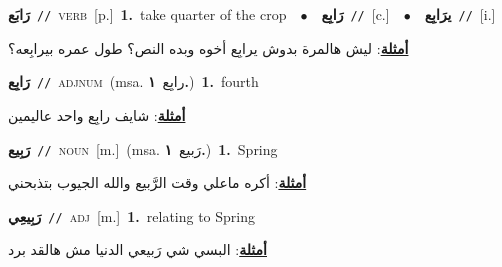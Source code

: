 \documentclass[10pt,a4paper,twoside]{article} %
\begin{document}
\begin{multicols}{2}
{\setlength\topsep{0pt}\textbf{\foreignlanguage{arabic}{رَابَع}}\ {\color{gray}\texttt{//}\color{black}}\ \textsc{verb}\ [p.]\ \textbf{1.}~take quarter of the crop\ \ $\bullet$\ \ \setlength\topsep{0pt}\textbf{\foreignlanguage{arabic}{رَابِع}}\ {\color{gray}\texttt{//}\color{black}}\ [c.]\ \ $\bullet$\ \ \setlength\topsep{0pt}\textbf{\foreignlanguage{arabic}{يرَابِع}}\ {\color{gray}\texttt{//}\color{black}}\ [i.]\  \begin{flushright}\color{gray}\foreignlanguage{arabic}{\textbf{\underline{\foreignlanguage{arabic}{أمثلة}}}: ليش هالمرة بدوش يرابِع أخوه وبده النص؟ طول عمره بيرابِعه؟}\end{flushright}\color{black}} \vspace{2mm}

{\setlength\topsep{0pt}\textbf{\foreignlanguage{arabic}{رَابِع}}\ {\color{gray}\texttt{//}\color{black}}\ \textsc{adj\textunderscore num}\ \color{gray}(msa. \foreignlanguage{arabic}{رابِع}~\foreignlanguage{arabic}{\textbf{١.}})\color{black}\ \textbf{1.}~fourth\  \begin{flushright}\color{gray}\foreignlanguage{arabic}{\textbf{\underline{\foreignlanguage{arabic}{أمثلة}}}: شايف رابِع واحد عاليمين}\end{flushright}\color{black}} \vspace{2mm}

{\setlength\topsep{0pt}\textbf{\foreignlanguage{arabic}{رَبِيع}}\ {\color{gray}\texttt{//}\color{black}}\ \textsc{noun}\ [m.]\ \color{gray}(msa. \foreignlanguage{arabic}{رَبيع}~\foreignlanguage{arabic}{\textbf{١.}})\color{black}\ \textbf{1.}~Spring\  \begin{flushright}\color{gray}\foreignlanguage{arabic}{\textbf{\underline{\foreignlanguage{arabic}{أمثلة}}}: أكره ماعلي وقت الرَّبيع والله الجيوب بتذبحني}\end{flushright}\color{black}} \vspace{2mm}

{\setlength\topsep{0pt}\textbf{\foreignlanguage{arabic}{رَبِيعِي}}\ {\color{gray}\texttt{//}\color{black}}\ \textsc{adj}\ [m.]\ \textbf{1.}~relating to Spring\  \begin{flushright}\color{gray}\foreignlanguage{arabic}{\textbf{\underline{\foreignlanguage{arabic}{أمثلة}}}: البسي شي رَبيعي الدنيا مش هالقد برد}\end{flushright}\color{black}} \vspace{2mm}


\end{multicols}
\end{document}
